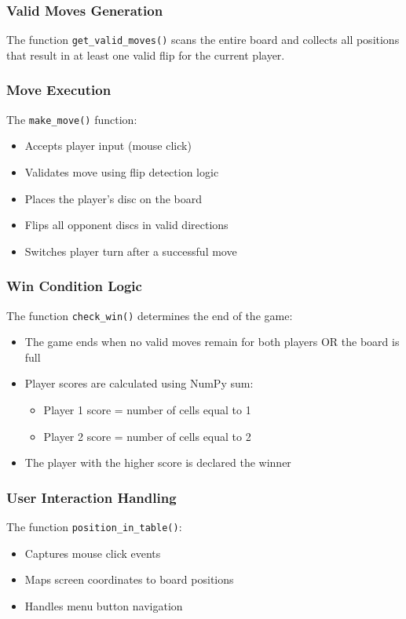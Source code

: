 \documentclass[12pt,letterpaper]{article}
\begin{document}
\subsubsection{Valid Moves Generation}
The function \texttt{get\_valid\_moves()} scans the entire board and collects all positions that result in at least one valid flip for the current player.
\subsubsection{Move Execution}
The \texttt{make\_move()} function:
\begin{itemize}
\item Accepts player input (mouse click)
\item Validates move using flip detection logic
\item Places the player's disc on the board
\item Flips all opponent discs in valid directions
\item Switches player turn after a successful move
\end{itemize}
\subsubsection{Win Condition Logic}
The function \texttt{check\_win()} determines the end of the game:
\begin{itemize}
\item The game ends when no valid moves remain for both players OR the board is full
\item Player scores are calculated using NumPy sum:
\begin{itemize}
\item Player 1 score = number of cells equal to 1
\item Player 2 score = number of cells equal to 2
\end{itemize}
\item The player with the higher score is declared the winner
\end{itemize}
\subsubsection{User Interaction Handling}
The function \texttt{position\_in\_table()}:
\begin{itemize}
\item Captures mouse click events
\item Maps screen coordinates to board positions
\item Handles menu button navigation
\end{itemize}
\end{document}

